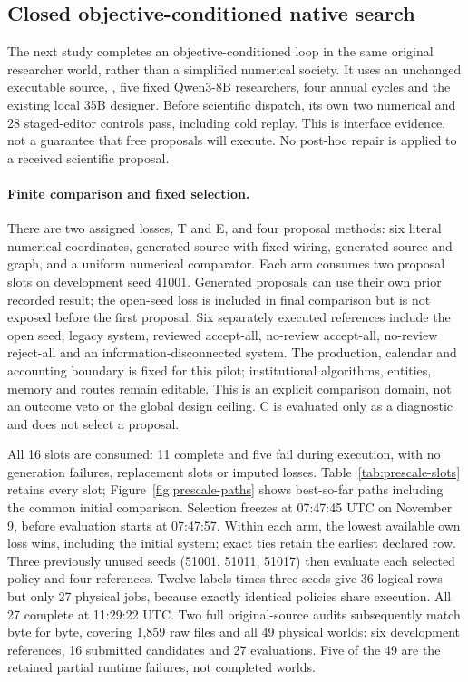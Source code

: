 \subsection{Closed objective-conditioned native search}
\label{sec:prescale-search}
The next study completes an objective-conditioned loop in the same original
researcher world, rather than a simplified numerical society. It uses an
unchanged executable source, , five fixed Qwen3-8B researchers,
four annual cycles and the existing local 35B designer. Before scientific
dispatch, its own two numerical and 28 staged-editor controls pass, including
cold replay. This is interface evidence, not a guarantee that free proposals
will execute. No post-hoc repair is applied to a received scientific proposal.

\paragraph{Finite comparison and fixed selection.}
There are two assigned losses, T and E, and four proposal methods: six literal
numerical coordinates, generated source with fixed wiring, generated source
and graph, and a uniform numerical comparator. Each arm consumes two proposal
slots on development seed 41001. Generated proposals can use their own prior
recorded result; the open-seed loss is included in final comparison but is
not exposed before the first proposal. Six separately executed references
include the open seed, legacy system, reviewed accept-all, no-review
accept-all, no-review reject-all and an information-disconnected system.
The production, calendar and accounting boundary is fixed for this pilot;
institutional algorithms, entities, memory and routes remain editable. This
is an explicit comparison domain, not an outcome veto or the global design
ceiling. C is evaluated only as a diagnostic and does not select a proposal.

All 16 slots are consumed: 11 complete and five fail during execution, with
no generation failures, replacement slots or imputed losses.
Table~\ref{tab:prescale-slots} retains every slot; Figure~\ref{fig:prescale-paths}
shows best-so-far paths including the common initial comparison. Selection
freezes at 07:47:45 UTC on November 9, before evaluation starts at 07:47:57.
Within each arm, the lowest available own loss wins, including the initial
system; exact ties retain the earliest declared row. Three previously unused
seeds (51001, 51011, 51017) then evaluate each selected policy and four
references. Twelve labels times three seeds give 36 logical rows but only
27 physical jobs, because exactly identical policies share execution.
All 27 complete at 11:29:22 UTC. Two full original-source audits subsequently
match byte for byte, covering 1,859 raw files and all 49 physical worlds:
six development references, 16 submitted candidates and 27 evaluations.
Five of the 49 are the retained partial runtime failures, not completed worlds.

